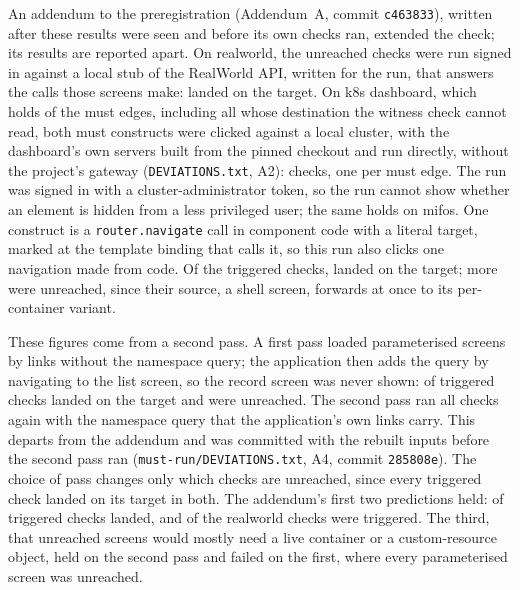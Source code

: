 An addendum to the preregistration (Addendum~A, commit \texttt{c463833}), written after these
results were seen and before its own checks ran, extended the check; its results are reported
apart. On realworld, the \MustRunAddRealworldChecks{} unreached checks were run signed in against a
local stub of the RealWorld API, written for the run, that answers the calls those screens make:
\MustRunAddRealworldConfirmed{} landed on the target. On k8s dashboard, which holds
\CensusMustKdash{} of the \CensusMust{} must edges, including all \MustWitnessUnread{} whose
destination the witness check cannot read, both must constructs were clicked against a local cluster,
with the dashboard's own servers built from the pinned checkout and run directly, without the
project's gateway (\texttt{DEVIATIONS.txt}, A2): \MustRunAddKdashChecks{} checks, one per must edge.
The run was signed in with a cluster-administrator token, so the run cannot show whether an element is
hidden from a less privileged user; the same holds on mifos. One construct is a \texttt{router.navigate} call in component code with a literal target,
marked at the template binding that calls it, so this run also clicks one navigation made from
code. Of the \MustRunAddKdashTriggered{} triggered checks, \MustRunAddKdashConfirmed{} landed on the
target; \MustRunAddKdashUnreached{} more were unreached, since their source, a shell screen,
forwards at once to its per-container variant.

These figures come from a second pass. A first pass loaded parameterised screens by links without
the namespace query; the application then adds the query by navigating to the list screen, so the
record screen was never shown: \MustRunAddFirstKdashConfirmed{} of \MustRunAddFirstKdashTriggered{} triggered
checks landed on the target and \MustRunAddFirstKdashUnreached{} were unreached. The second pass
ran all \MustRunAddKdashChecks{} checks again with the namespace query that the application's own
links carry. This departs from the addendum and was committed with the rebuilt inputs before the
second pass ran (\texttt{must-run/DEVIATIONS.txt}, A4, commit \texttt{285808e}). The choice of
pass changes only which checks are unreached, since every triggered check landed on its target in
both. The addendum's first two predictions held: \MustRunAddAllConfirmed{} of \MustRunAddAllTriggered{} triggered checks landed, and
\MustRunAddRealworldTriggered{} of the \MustRunAddRealworldChecks{} realworld checks were triggered. The third, that unreached screens would mostly need a live
container or a custom-resource object, held on the second pass and failed on the first, where
every parameterised screen was unreached.

